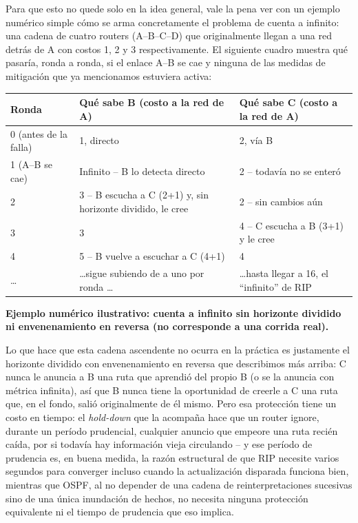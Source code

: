 \documentclass[11pt,a4paper]{article}
\newcommand{\figcaption}[1]{\par\noindent\footnotesize\textbf{#1}\par\vspace{0.4cm}}
\begin{document}
Para que esto no quede solo en la idea general, vale la pena ver con un ejemplo num\'erico simple c\'omo se arma concretamente el problema de cuenta a infinito: una cadena de cuatro routers (A--B--C--D) que originalmente llegan a una red detr\'as de A con costos 1, 2 y 3 respectivamente. El siguiente cuadro muestra qu\'e pasar\'ia, ronda a ronda, si el enlace A--B se cae y ninguna de las medidas de mitigaci\'on que ya mencionamos estuviera activa:

\needspace{1cm}
\begin{center}
\begin{minipage}{0.85\linewidth}
\centering
\small
\begin{tabular}{@{}p{2.6cm}p{4.7cm}p{4.7cm}@{}}
\toprule
\textbf{Ronda} & \textbf{Qu\'e sabe B (costo a la red de A)} & \textbf{Qu\'e sabe C (costo a la red de A)} \\
\midrule
0 (antes de la falla) & 1, directo & 2, v\'ia B \\
1 (A--B se cae) & Infinito -- B lo detecta directo & 2 -- todav\'ia no se enter\'o \\
2 & 3 -- B escucha a C (2+1) y, sin horizonte dividido, le cree & 2 -- sin cambios a\'un \\
3 & 3 & 4 -- C escucha a B (3+1) y le cree \\
4 & 5 -- B vuelve a escuchar a C (4+1) & 4 \\
\ldots & \ldots sigue subiendo de a uno por ronda \ldots & \ldots hasta llegar a 16, el ``infinito'' de RIP \\
\bottomrule
\end{tabular}
\par\vspace{0.1cm}
\figcaption{Ejemplo num\'erico ilustrativo: cuenta a infinito sin horizonte dividido ni envenenamiento en reversa (no corresponde a una corrida real).}
\end{minipage}
\end{center}

Lo que hace que esta cadena ascendente no ocurra en la pr\'actica es justamente el horizonte dividido con envenenamiento en reversa que describimos m\'as arriba: C nunca le anuncia a B una ruta que aprendi\'o del propio B (o se la anuncia con m\'etrica infinita), as\'i que B nunca tiene la oportunidad de creerle a C una ruta que, en el fondo, sali\'o originalmente de \'el mismo. Pero esa protecci\'on tiene un costo en tiempo: el \textit{hold-down} que la acompa\~na hace que un router ignore, durante un per\'iodo prudencial, cualquier anuncio que empeore una ruta reci\'en ca\'ida, por si todav\'ia hay informaci\'on vieja circulando -- y ese per\'iodo de prudencia es, en buena medida, la raz\'on estructural de que RIP necesite varios segundos para converger incluso cuando la actualizaci\'on disparada funciona bien, mientras que OSPF, al no depender de una cadena de reinterpretaciones sucesivas sino de una \'unica inundaci\'on de hechos, no necesita ninguna protecci\'on equivalente ni el tiempo de prudencia que eso implica.
\end{document}
